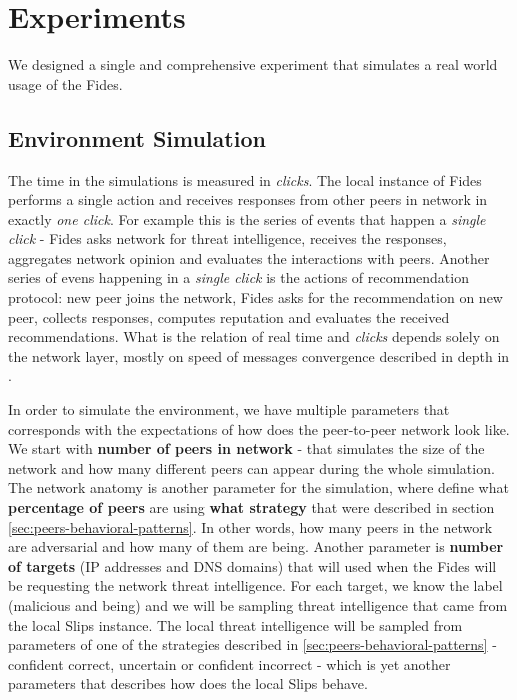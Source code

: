 \chapter{Experiments}
\label{chap:experiments}

We designed a single and comprehensive experiment that simulates a real world usage of the Fides. 





\section{Environment Simulation}
\label{sec:environment-simulation}
The time in the simulations is measured in \textit{clicks}. 
The local instance of Fides performs a single action and receives responses from other peers in network in exactly \textit{one click}. 
For example this is the series of events that happen a \textit{single click} - Fides asks network for threat intelligence, receives the responses, aggregates network opinion and evaluates the interactions with peers.
Another series of evens happening in a \textit{single click} is the actions of  recommendation protocol: new peer joins the network, Fides asks for the recommendation on new peer, collects responses, computes reputation and evaluates the received recommendations.
What is the relation of real time and \textit{clicks} depends solely on the network layer, mostly on speed of messages convergence described in depth in \cite{nl}.

In order to simulate the environment, we have multiple parameters that corresponds with the expectations of how does the peer-to-peer network look like.
We start with \textbf{number of peers in network} - that simulates the size of the network and how many different peers can appear during the whole simulation.
The network anatomy is another parameter for the simulation, where define what \textbf{percentage of peers} are using \textbf{what strategy} that were described in section \ref{sec:peers-behavioral-patterns}. 
In other words, how many peers in the network are adversarial and how many of them are being.
Another parameter is \textbf{number of targets} (IP addresses and DNS domains) that will used when the Fides will be requesting the network threat intelligence.
For each target, we know the label (malicious and being) and we will be sampling threat intelligence that came from the local Slips instance. 
The local threat intelligence will be sampled from parameters of one of the strategies described in \ref{sec:peers-behavioral-patterns} - confident correct, uncertain or confident incorrect - which is yet another parameters that describes how does the local Slips behave.

